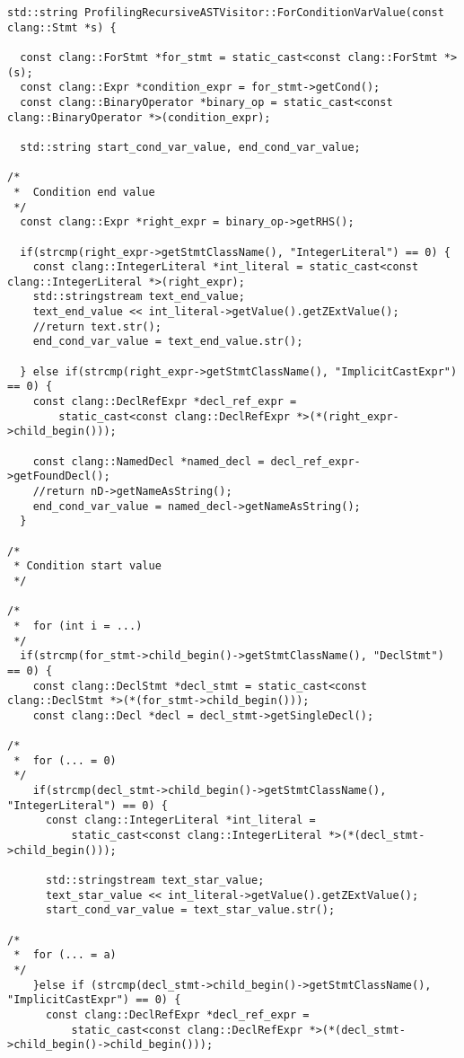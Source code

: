 \documentclass[a4paper,11pt,twoside]{book}
\begin{document}
\begin{lstlisting}[language=CCC, caption=driver/program.cpp]
std::string ProfilingRecursiveASTVisitor::ForConditionVarValue(const clang::Stmt *s) {

  const clang::ForStmt *for_stmt = static_cast<const clang::ForStmt *>(s);
  const clang::Expr *condition_expr = for_stmt->getCond();
  const clang::BinaryOperator *binary_op = static_cast<const clang::BinaryOperator *>(condition_expr);
  
  std::string start_cond_var_value, end_cond_var_value;

/*
 *  Condition end value
 */
  const clang::Expr *right_expr = binary_op->getRHS();

  if(strcmp(right_expr->getStmtClassName(), "IntegerLiteral") == 0) {
    const clang::IntegerLiteral *int_literal = static_cast<const clang::IntegerLiteral *>(right_expr);
    std::stringstream text_end_value;
    text_end_value << int_literal->getValue().getZExtValue();
    //return text.str();
    end_cond_var_value = text_end_value.str();

  } else if(strcmp(right_expr->getStmtClassName(), "ImplicitCastExpr") == 0) {
  	const clang::DeclRefExpr *decl_ref_expr = 
        static_cast<const clang::DeclRefExpr *>(*(right_expr->child_begin()));
  	
    const clang::NamedDecl *named_decl = decl_ref_expr->getFoundDecl();
  	//return nD->getNameAsString(); 
    end_cond_var_value = named_decl->getNameAsString();
  }

/*
 * Condition start value
 */

/*
 *  for (int i = ...)
 */
  if(strcmp(for_stmt->child_begin()->getStmtClassName(), "DeclStmt") == 0) {
    const clang::DeclStmt *decl_stmt = static_cast<const clang::DeclStmt *>(*(for_stmt->child_begin()));
    const clang::Decl *decl = decl_stmt->getSingleDecl();

/*
 *  for (... = 0)
 */
    if(strcmp(decl_stmt->child_begin()->getStmtClassName(), "IntegerLiteral") == 0) {      
      const clang::IntegerLiteral *int_literal = 
          static_cast<const clang::IntegerLiteral *>(*(decl_stmt->child_begin())); 
      
      std::stringstream text_star_value;
      text_star_value << int_literal->getValue().getZExtValue();
      start_cond_var_value = text_star_value.str();

/*
 *  for (... = a)
 */
    }else if (strcmp(decl_stmt->child_begin()->getStmtClassName(), "ImplicitCastExpr") == 0) {
      const clang::DeclRefExpr *decl_ref_expr = 
          static_cast<const clang::DeclRefExpr *>(*(decl_stmt->child_begin()->child_begin()));
      

\end{lstlisting}
\end{document}
